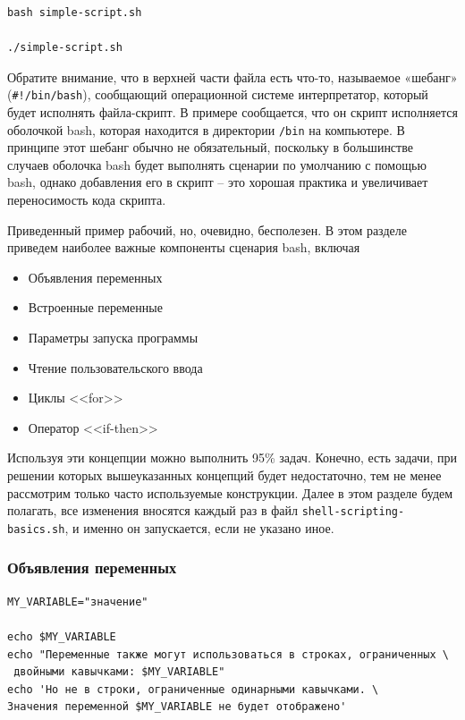 \documentclass[12pt]{article}
\providecommand{\tightlist}{%
  \setlength{\itemsep}{0pt}\setlength{\parskip}{0pt}}
\begin{document}
\begin{verbatim}
bash simple-script.sh

./simple-script.sh
\end{verbatim}

Обратите внимание, что в верхней части файла есть что-то, называемое
«шебанг» (\texttt{\#!/bin/bash}), сообщающий операционной системе
интерпретатор, который будет исполнять файла-скрипт. В примере
сообщается, что он скрипт исполняется оболочкой bash, которая находится
в директории \texttt{/bin} на компьютере. В принципе этот шебанг обычно
не обязательный, поскольку в большинстве случаев оболочка bash будет
выполнять сценарии по умолчанию с помощью bash, однако добавления его в
скрипт -- это хорошая практика и увеличивает переносимость кода скрипта.

Приведенный пример рабочий, но, очевидно, бесполезен. В этом разделе
приведем наиболее важные компоненты сценария bash, включая

\begin{itemize}
\tightlist
\item
  Объявления переменных
\item
  Встроенные переменные
\item
  Параметры запуска программы
\item
  Чтение пользовательского ввода
\item
  Циклы <<for>>
\item
  Оператор <<if-then>>
\end{itemize}

Используя эти концепции можно выполнить 95\% задач. Конечно, есть
задачи, при решении которых вышеуказанных концепций будет недостаточно,
тем не менее рассмотрим только часто используемые конструкции. Далее в
этом разделе будем полагать, все изменения вносятся каждый раз в файл
\texttt{shell-scripting-basics.sh}, и именно он запускается, если не
указано иное.

\hypertarget{Variable-declarations}{%
\subsubsection{\texorpdfstring{\protect\hyperlink{Variable-declarations}{}Объявления
переменных}{Объявления переменных}}\label{Variable-declarations}}

\begin{verbatim}
MY_VARIABLE="значение"

echo $MY_VARIABLE
echo "Переменные также могут использоваться в строках, ограниченных \
 двойными кавычками: $MY_VARIABLE"
echo 'Но не в строки, ограниченные одинарными кавычками. \
Значения переменной $MY_VARIABLE не будет отображено'
\end{verbatim}
\end{document}
